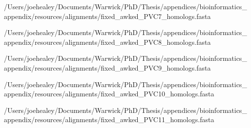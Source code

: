 \begin{texshade}{/Users/joehealey/Documents/Warwick/PhD/Thesis/appendices/bioinformatics_appendix/resources/alignments/fixed_awked_PVC7_homologs.fasta}
\noblockskip
\hideconsensus
\end{texshade}

\begin{texshade}{/Users/joehealey/Documents/Warwick/PhD/Thesis/appendices/bioinformatics_appendix/resources/alignments/fixed_awked_PVC8_homologs.fasta}
\noblockskip
\hideconsensus
\end{texshade}

\begin{texshade}{/Users/joehealey/Documents/Warwick/PhD/Thesis/appendices/bioinformatics_appendix/resources/alignments/fixed_awked_PVC9_homologs.fasta}
\noblockskip
\hideconsensus
\end{texshade}

\begin{texshade}{/Users/joehealey/Documents/Warwick/PhD/Thesis/appendices/bioinformatics_appendix/resources/alignments/fixed_awked_PVC10_homologs.fasta}
\noblockskip
\hideconsensus
\end{texshade}

\begin{texshade}{/Users/joehealey/Documents/Warwick/PhD/Thesis/appendices/bioinformatics_appendix/resources/alignments/fixed_awked_PVC11_homologs.fasta}
\noblockskip
\hideconsensus
\end{texshade}

